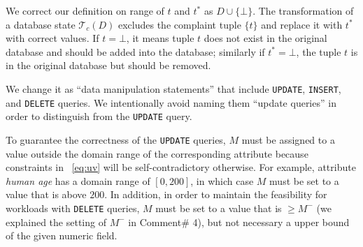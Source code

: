  


\begin{quote}
\end{quote}

We correct our definition on range of $t$ and $t^*$ as $D \cup \{\bot\}$. The transformation of 
a database state $\mathcal{T}_c(D)$ excludes the complaint tuple $\{t\}$ and replace it with 
$t^*$ with correct values. If $t = \bot$, it means tuple $t$ does not exist in the original
database and should be added into the database; similarly if $t^* = \bot$, the tuple $t$ is in
the original database but should be removed. 


\begin{quote}
\end{quote}

We change it as ``data manipulation statements'' that include \texttt{UPDATE},
\texttt{INSERT}, and \texttt{DELETE} queries. We intentionally avoid naming 
them ``update queries'' in order to distinguish from the \texttt{UPDATE} query. 



\begin{quote}
\end{quote}

To guarantee the correctness of the \texttt{UPDATE} queries, $M$ must 
be assigned to a value outside the domain range of the corresponding attribute 
because constraints in ~\ref{eq:uv} will be self-contradictory otherwise. For example, 
attribute \textit{human age} has a domain range of $[0, 200]$, in which case $M$ must be 
set to a value that is above $200$. 
In addition, in order to maintain the feasibility for workloads with \texttt{DELETE}
queries, $M$ must be set to a value that is $\geq M^-$ (we explained
the setting of $M^-$ in Comment\# 4), but not necessary a 
upper bound of the given numeric field. 

